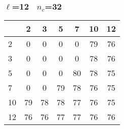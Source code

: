 \documentclass{article}
\begin{document}
\subsubsection*{$\ell$=12~ $n_c$=32}\begin{tabular}{|l|c|c|c|c|c|c|}
\hline
&2&3&5&7&10&12\\
\hline
2&0&0&0&0&79&76\\
3&0&0&0&0&78&76\\
5&0&0&0&80&78&75\\
7&0&0&79&78&76&75\\
10&79&78&78&77&76&75\\
12&76&76&77&77&76&76\\
\hline
\end{tabular}
\\ 
\\ \\ \\ 

 
\end{document}
